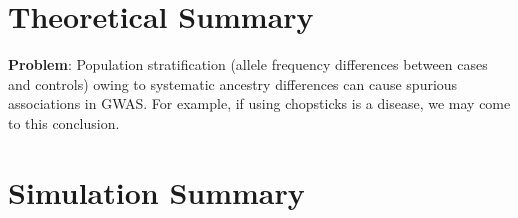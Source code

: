 \section{Theoretical Summary}

{\noindent \bf Problem}: 
Population stratification (allele frequency differences between cases and controls) owing to systematic ancestry differences can cause spurious associations in GWAS. 
For example, if using chopsticks is a disease, we may come to this conclusion.

\section{Simulation Summary}